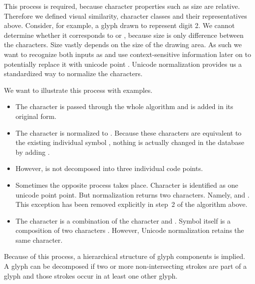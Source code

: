 This process is required, because character properties such as size are relative.
Therefore we defined visual similarity, character classes and their representatives above.
Consider, for example, a glyph drawn to represent digit 2.
We cannot determine whether it corresponds to  or ,
because size is only difference between the characters. Size vastly depends on the size of the drawing area.
As such we want to recognize both inputs as  and use context-sensitive information later on
to potentially replace it with unicode point .
Unicode normalization provides us a standardized way to normalize the characters.

We want to illustrate this process with examples.
\begin{itemize}
  \item
    The character  is passed through the whole algorithm
    and is added in its original form.
  \item
    The character  is normalized to .
    Because these characters are equivalent to the existing individual symbol ,
    nothing is actually changed in the database by adding .
  \item
    However,  is not decomposed into three individual code points.
  \item
    Sometimes the opposite process takes place. Character  is identified as one unicode point point.
    But normalization returns two characters.
    Namely,  and .
    This exception has been removed explicitly in step~2 of the algorithm above.
  \item
    The character  is a combination of the character 
    and .
    Symbol  itself is a composition of two characters .
    However, Unicode normalization retains the same character.
\end{itemize}

Because of this process, a hierarchical structure of glyph components is implied.
A glyph can be decomposed if two or more non-intersecting strokes are part of a glyph
and those strokes occur in at least one other glyph.

